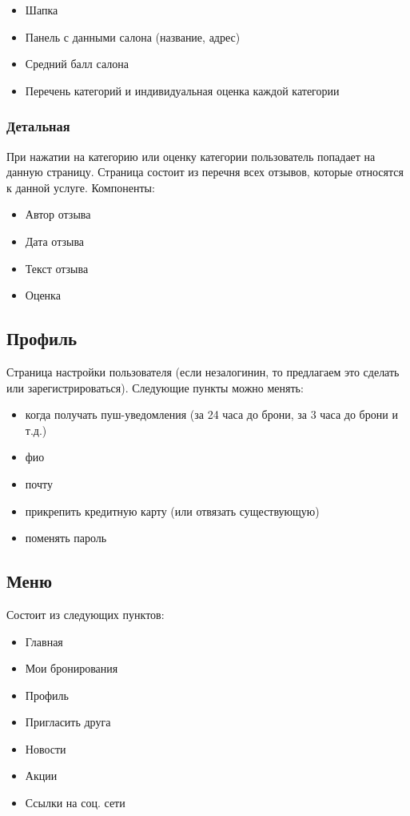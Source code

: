 \documentclass[DIV=calc, paper=a4, fontsize=11pt]{scrartcl} %
\begin{document}
\begin{itemize}
	\item Шапка
	\item Панель с данными салона (название, адрес)
	\item Средний балл салона
	\item Перечень категорий и индивидуальная оценка каждой категории
\end{itemize}

\subsubsection{Детальная}
При нажатии на категорию или оценку категории пользователь попадает на данную страницу. Страница состоит из перечня всех отзывов, которые относятся к данной услуге. Компоненты:

\begin{itemize}
	\item Автор отзыва
	\item Дата отзыва
	\item Текст отзыва
	\item Оценка 
\end{itemize}

\subsection{Профиль}
Страница настройки пользователя (если незалогинин, то предлагаем это сделать или зарегистрироваться). Следующие пункты можно менять:

\begin{itemize}
	\item когда получать пуш-уведомления (за 24 часа до брони, за 3 часа до брони и т.д.)
	\item фио
	\item почту
	\item прикрепить кредитную карту (или отвязать существующую)
	\item поменять пароль
\end{itemize}

\subsection{Меню}
Состоит из следующих пунктов:

\begin{itemize}
	\item Главная
	\item Мои бронирования
	\item Профиль
	\item Пригласить друга
	\item Новости
	\item Акции
	\item Ссылки на соц. сети
\end{itemize}
\end{document}
